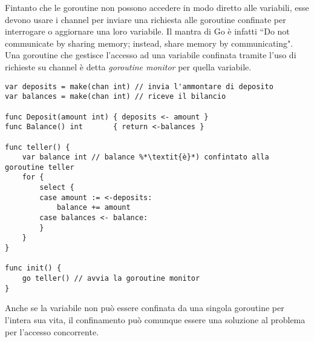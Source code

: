 \documentclass[../../thesis.tex]{subfiles}
\begin{document}
    Fintanto che le goroutine non possono accedere in modo diretto alle variabili, esse devono usare i channel per inviare una richiesta alle goroutine confinate per interrogare o aggiornare una loro variabile.
    Il mantra di Go è infatti ``Do not communicate by sharing memory;
    instead, share memory by communicating".
    Una goroutine che gestisce l'accesso ad una variabile confinata tramite l'uso di richieste su channel è detta \textit{goroutine monitor} per quella variabile.
    \begin{lstlisting}[frame = single, label = {lst:lstlisting9-1.6}]
var deposits = make(chan int) // invia l'ammontare di deposito
var balances = make(chan int) // riceve il bilancio

func Deposit(amount int) { deposits <- amount }
func Balance() int       { return <-balances }

func teller() {
    var balance int // balance %*\textit{è}*) confintato alla goroutine teller
    for {
        select {
        case amount := <-deposits:
            balance += amount
        case balances <- balance:
        }
    }
}

func init() {
    go teller() // avvia la goroutine monitor
}
    \end{lstlisting}
    Anche se la variabile non può essere confinata da una singola goroutine per l'intera sua vita, il confinamento può comunque essere una soluzione al problema per l'accesso concorrente.
\end{document}
